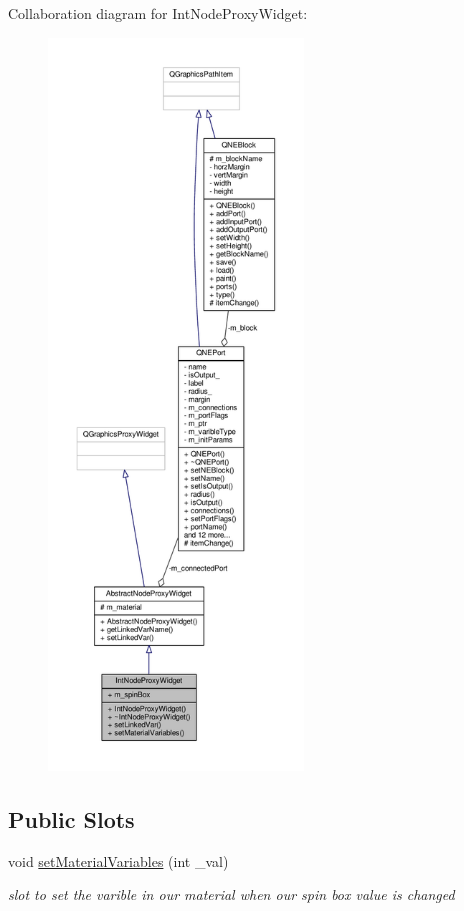 Collaboration diagram for Int\-Node\-Proxy\-Widget\-:
\nopagebreak
\begin{figure}[H]
\begin{center}
\leavevmode
\includegraphics[height=550pt]{class_int_node_proxy_widget__coll__graph}
\end{center}
\end{figure}
\subsection*{Public Slots}
\begin{DoxyCompactItemize}
\item 
void \hyperlink{class_int_node_proxy_widget_a04d972bdd37258011454c1fc116723cd}{set\-Material\-Variables} (int \-\_\-val)
\begin{DoxyCompactList}\small\item\em slot to set the varible in our material when our spin box value is changed \end{DoxyCompactList}\end{DoxyCompactItemize}
